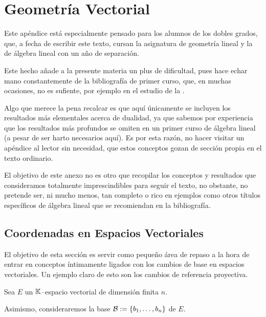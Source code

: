 \chapter{Geometría Vectorial}
\label{GeometriaVectorial}
Este apéndice está especialmente pensado para los alumnos de los dobles grados, que, a fecha de escribir este texto, cursan la asignatura de geometría lineal y la de álgebra lineal con un año de separación.

Este hecho añade a la presente materia un plus de dificultad, pues hace echar mano constantemente de la bibliografía de primer curso, que, en muchas ocasiones, no es sufiente, por ejemplo en el estudio de la .

Algo que merece la pena recalcar es que aquí únicamente se incluyen los resultados más elementales acerca de dualidad, ya que sabemos por experiencia que los resultados más profundos se omiten en un primer curso de álgebra lineal (a pesar de ser harto necesarios aquí). Es por esta razón, no hacer visitar un apéndice al lector sin necesidad, que estos conceptos gozan de sección propia en el texto ordinario.

El objetivo de este anexo no es otro que recopilar los conceptos y resultados que consideramos totalmente imprescindibles para seguir el texto, no obstante, no pretende ser, ni mucho menos, tan completo o rico en ejemplos como otros títulos específicos de álgebra lineal que se recomiendan en la bibliografía.
\section{Coordenadas en Espacios Vectoriales}
El objetivo de esta sección es servir como pequeño área de repaso a la hora de entrar en conceptos íntimamente ligados con los cambios de base en espacios vectoriales. Un ejemplo claro de esto son los cambios de referencia proyectiva.

Sea $E$ un $\mathbb{K}$--espacio vectorial de dimensión finita $n$.

Asimismo, consideraremos la base $\mathcal{B}:=\{b_1,\dots,b_n\}$ de $E$.

